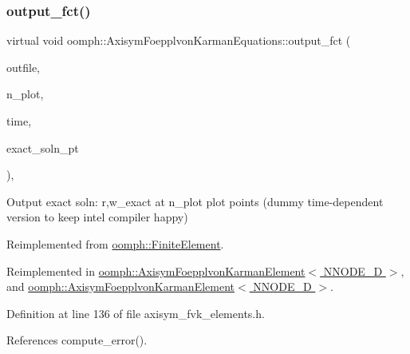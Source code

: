 \subsubsection{\texorpdfstring{output\+\_\+fct()}{output\_fct()}\hspace{0.1cm}{\footnotesize\ttfamily [2/4]}}
{\footnotesize\ttfamily virtual void oomph\+::\+Axisym\+Foepplvon\+Karman\+Equations\+::output\+\_\+fct (\begin{DoxyParamCaption}\item[{std\+::ostream \&}]{outfile,  }\item[{const unsigned \&}]{n\+\_\+plot,  }\item[{const double \&}]{time,  }\item[{\hyperlink{classoomph_1_1FiniteElement_ad4ecf2b61b158a4b4d351a60d23c633e}{Finite\+Element\+::\+Unsteady\+Exact\+Solution\+Fct\+Pt}}]{exact\+\_\+soln\+\_\+pt }\end{DoxyParamCaption})\hspace{0.3cm}{\ttfamily [inline]}, {\ttfamily [virtual]}}



Output exact soln\+: r,w\+\_\+exact at n\+\_\+plot plot points (dummy time-\/dependent version to keep intel compiler happy) 



Reimplemented from \hyperlink{classoomph_1_1FiniteElement_a2a8426dccd57b927be0ae0eec00d0479}{oomph\+::\+Finite\+Element}.



Reimplemented in \hyperlink{classoomph_1_1AxisymFoepplvonKarmanElement_a290c4391d1da3688805466cf2852a93e}{oomph\+::\+Axisym\+Foepplvon\+Karman\+Element$<$ N\+N\+O\+D\+E\+\_\+D $>$}, and \hyperlink{classoomph_1_1AxisymFoepplvonKarmanElement_a290c4391d1da3688805466cf2852a93e}{oomph\+::\+Axisym\+Foepplvon\+Karman\+Element$<$ N\+N\+O\+D\+E\+\_\+D $>$}.



Definition at line 136 of file axisym\+\_\+fvk\+\_\+elements.\+h.



References compute\+\_\+error().

\mbox{\label{classoomph_1_1AxisymFoepplvonKarmanEquations_aae7ed0c9ae0e1a1e2656534807a24527}} 
